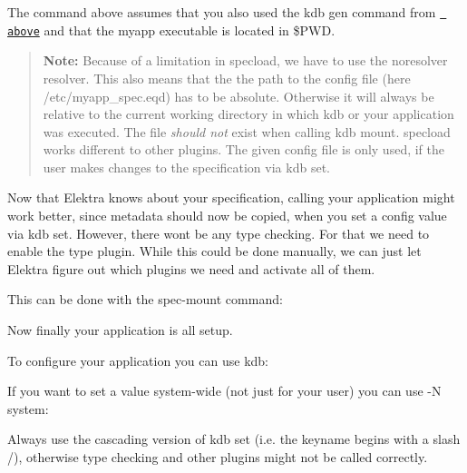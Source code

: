 The command above assumes that you also used the {\ttfamily kdb gen} command from \href{\#invoking-the-code-generator}{\texttt{ above}} and that the {\ttfamily myapp} executable is located in {\ttfamily \$\+P\+WD}.

\begin{quote}
{\bfseries{Note\+:}} Because of a limitation in {\ttfamily specload}, we have to use the {\ttfamily noresolver} resolver. This also means that the the path to the config file (here {\ttfamily /etc/myapp\+\_\+spec.eqd}) has to be absolute. Otherwise it will always be relative to the current working directory in which {\ttfamily kdb} or your application was executed. The file {\itshape should not} exist when calling {\ttfamily kdb mount}. {\ttfamily specload} works different to other plugins. The given config file is only used, if the user makes changes to the specification via {\ttfamily kdb set}. \end{quote}


Now that Elektra knows about your specification, calling your application might work better, since metadata should now be copied, when you set a config value via {\ttfamily kdb set}. However, there won\textquotesingle{}t be any type checking. For that we need to enable the {\ttfamily type} plugin. While this could be done manually, we can just let Elektra figure out which plugins we need and activate all of them.

This can be done with the {\ttfamily spec-\/mount} command\+:


\begin{DoxyCode}{0}
\end{DoxyCode}


Now finally your application is all setup.

To configure your application you can use {\ttfamily kdb}\+:


\begin{DoxyCode}{0}
\end{DoxyCode}


If you want to set a value system-\/wide (not just for your user) you can use {\ttfamily -\/N system}\+:


\begin{DoxyCode}{0}
\end{DoxyCode}


Always use the cascading version of {\ttfamily kdb set} (i.\+e. the keyname begins with a slash {\ttfamily /}), otherwise type checking and other plugins might not be called correctly. 